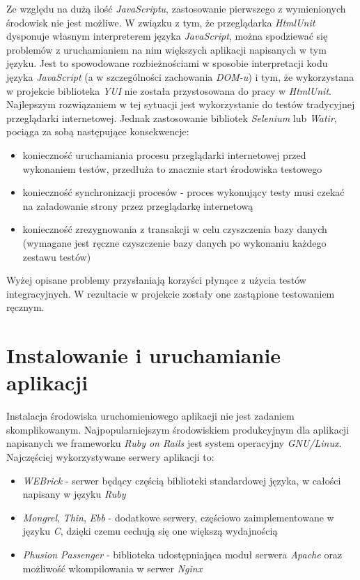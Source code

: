 \documentclass[11pt,twoside]{report}
\begin{document}
Ze względu na dużą ilość \emph{JavaScriptu}, zastosowanie pierwszego z
wymienionych środowisk nie jest możliwe. W związku z tym, że
przeglądarka \emph{HtmlUnit} dysponuje własnym interpreterem języka
\emph{JavaScript}, można spodziewać się problemów z uruchamianiem na
nim większych aplikacji napisanych w tym języku. Jest to spowodowane
rozbieżnościami w sposobie interpretacji kodu języka \emph{JavaScript}
(a w szczególności zachowania \emph{DOM-u}) i tym, że wykorzystana w
projekcie biblioteka \emph{YUI} nie została przystosowana do pracy w
\emph{HtmlUnit}. Najlepszym rozwiązaniem w tej sytuacji jest
wykorzystanie do testów tradycyjnej przeglądarki internetowej. Jednak
zastosowanie bibliotek \emph{Selenium} lub \emph{Watir}, pociąga za
sobą następujące konsekwencje:

\begin{itemize}
\item konieczność uruchamiania procesu przeglądarki internetowej przed
  wykonaniem testów, przedłuża to znacznie start środowiska testowego
\item konieczność synchronizacji procesów - proces wykonujący testy
  musi czekać na załadowanie strony przez przeglądarkę internetową
\item konieczność zrezygnowania z transakcji w celu czyszczenia bazy
  danych (wymagane jest ręczne czyszczenie bazy danych po wykonaniu
  każdego zestawu testów)
\end{itemize}

Wyżej opisane problemy przysłaniają korzyści płynące z użycia testów
integracyjnych. W rezultacie w projekcie zostały one zastąpione
testowaniem ręcznym.

\cleardoublepage

\section{Instalowanie i uruchamianie aplikacji}
Instalacja środowiska uruchomieniowego aplikacji nie jest zadaniem
skomplikowanym. Najpopularniejszym środowiskiem produkcyjnym dla
aplikacji napisanych we frameworku \emph{Ruby on Rails} jest system
operacyjny \emph{GNU/Linux}. Najczęściej wykorzystywane serwery
aplikacji to:

\begin{itemize}
\item \emph{WEBrick} - serwer będący częścią biblioteki standardowej
  języka, w całości napisany w języku \emph{Ruby}
\item \emph{Mongrel}, \emph{Thin}, \emph{Ebb} - dodatkowe serwery,
  częściowo zaimplementowane w języku \emph{C}, dzięki czemu cechują
  się one większą wydajnością
\item \emph{Phusion Passenger} - biblioteka udostępniająca moduł
  serwera \emph{Apache} oraz możliwość wkompilowania w serwer
  \emph{Nginx}
\end{itemize}
\end{document}
